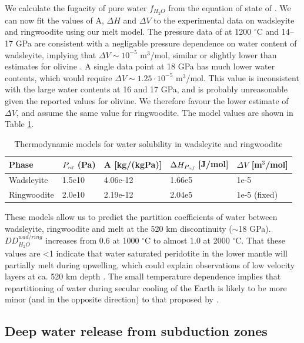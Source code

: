 \documentclass[review]{elsarticle}
\begin{document}
We calculate the fugacity of pure water $f_{H_2O}$ from the equation of state of \citep{PS1995}. We can now fit the values of A, $\Delta H$ and $\Delta V$ to the experimental data on wadsleyite and ringwoodite using our melt model. The pressure data of \cite{DDFK2005} at 1200 $^{\circ}$C and 14--17 GPa are consistent with a negligable pressure dependence on water content of wadsleyite, implying that $\Delta V \sim 10^{-5}$ m$^3$/mol, similar or slightly lower than estimates for olivine \citep[1.00 -- 1.06 $\cdot 10^{-5}$ m$^3$/mol][]{KKR1996, ZGK2004, MDAR2006}. A single data point at 18 GPa has much lower water contents, which would require $\Delta V \sim 1.25 \cdot 10^{-5}$ m$^3$/mol. This value is inconsistent with the large water contents at 16 and 17 GPa, and is probably unreasonable given the reported values for olivine. We therefore favour the lower estimate of $\Delta V$, and assume the same value for ringwoodite. The model values are shown in Table \ref{table:partitioning}.

\begin{table}[]
\centering
\caption{Thermodynamic models for water solubility in wadsleyite and ringwoodite}
\label{table:partitioning}
\begin{tabular}{lllll}
Phase & $P_{\textit{\tiny{ref}}}$ (Pa) & A [kg/(kgPa)] & $\Delta H_{P_{\textit{\tiny{ref}}}}$ [J/mol] & $\Delta V$ [m$^3$/mol] \\
\hline
Wadsleyite & 1.5e10 & 4.06e-12 & 1.66e5 & 1e-5 \\
Ringwoodite & 2.0e10 & 2.19e-12 & 2.04e5 & 1e-5 (fixed) \\
\end{tabular}
\end{table}


These models allow us to predict the partition coefficients of water between wadsleyite, ringwoodite and melt at the 520 km discontinuity ($\sim$18 GPa). $DD^{wad/ring}_{H_2O}$ increases from 0.6 at 1000 $^{\circ}$C to almost 1.0 at 2000 $^{\circ}$C. That these values are <1 indicate that water saturated peridotite in the lower mantle will partially melt during upwelling, which could explain observations of low velocity layers at ca. 520 km depth \citep[e.g.][]{JDH2010}. The small temperature dependence implies that repartitioning of water during secular cooling of the Earth is likely to be more minor (and in the opposite direction) to that proposed by \cite{DDFK2005}. 



\subsection{Deep water release from subduction zones}
\cite{MF2010}
\cite{BK2003}
\cite{MSK2008}
\end{document}
